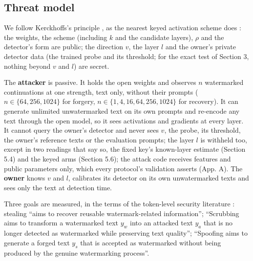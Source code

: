 \documentclass[11pt,letterpaper]{article}
\begin{document}
\hypertarget{threat-model}{%
\subsection{Threat model}\label{threat-model}}

We follow Kerckhoffs's principle \citep{kerckhoffs1883cryptographie}, as the nearest keyed activation scheme does \citep{aremu2026awm}: the weights, the scheme (including \(k\) and the candidate layers), \(\rho\) and the detector's form are public; the direction \(v\), the layer \(l\) and the owner's private detector data (the trained probe and its threshold; for the exact test of Section 3, nothing beyond \(v\) and \(l\)) are secret.

The \textbf{attacker} is passive. It holds the open weights and observes \(n\) watermarked continuations at one strength, text only, without their prompts (\(n \in \{64, 256, 1024\}\) for forgery, \(n \in \{1, 4, 16, 64, 256, 1024\}\) for recovery). It can generate unlimited unwatermarked text on its own prompts and re-encode any text through the open model, so it sees activations and gradients at every layer. It cannot query the owner's detector and never sees \(v\), the probe, its threshold, the owner's reference texts or the evaluation prompts; the layer \(l\) is withheld too, except in two readings that say so, the fixed key's known-layer estimate (Section 5.4) and the keyed arms (Section 5.6); the attack code receives features and public parameters only, which every protocol's validation asserts (App. A). The \textbf{owner} knows \(v\) and \(l\), calibrates its detector on its own unwatermarked texts and sees only the text at detection time.

Three goals are measured, in the terms of the token-level security literature \citep[p.~3]{li2026marksec}: stealing ``aims to recover reusable watermark-related information''; ``Scrubbing aims to transform a watermarked text \(y_w\) into an attacked text \(y_a\) that is no longer detected as watermarked while preserving text quality''; ``Spoofing aims to generate a forged text \(y_s\) that is accepted as watermarked without being produced by the genuine watermarking process''.
\end{document}
